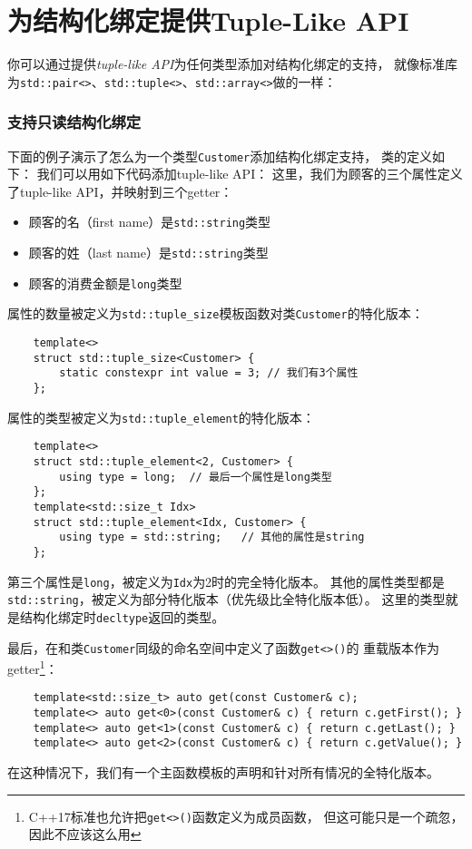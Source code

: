 \section{为结构化绑定提供Tuple-Like API}
你可以通过提供\emph{tuple-like API}为任何类型添加对结构化绑定的支持，
就像标准库为\texttt{std::pair<>}、\texttt{std::tuple<>}、\texttt{std::array<>}做的一样：

\subsubsection{支持只读结构化绑定}
下面的例子演示了怎么为一个类型\texttt{Customer}添加结构化绑定支持，
类的定义如下：
我们可以用如下代码添加tuple-like API：
这里，我们为顾客的三个属性定义了tuple-like API，并映射到三个getter：
\begin{itemize}
    \item 顾客的名（first name）是\texttt{std::string}类型
    \item 顾客的姓（last name）是\texttt{std::string}类型
    \item 顾客的消费金额是\texttt{long}类型
\end{itemize}
属性的数量被定义为\texttt{std::tuple\_size}模板函数对类\texttt{Customer}的特化版本：
\begin{lstlisting}
    template<>
    struct std::tuple_size<Customer> {
        static constexpr int value = 3; // 我们有3个属性
    };
\end{lstlisting}
属性的类型被定义为\texttt{std::tuple\_element}的特化版本：
\begin{lstlisting}
    template<>
    struct std::tuple_element<2, Customer> {
        using type = long;  // 最后一个属性是long类型
    };
    template<std::size_t Idx>
    struct std::tuple_element<Idx, Customer> {
        using type = std::string;   // 其他的属性是string
    };
\end{lstlisting}
第三个属性是\texttt{long}，被定义为\texttt{Idx}为2时的完全特化版本。
其他的属性类型都是\texttt{std::string}，被定义为部分特化版本（优先级比全特化版本低）。
这里的类型就是结构化绑定时\texttt{decltype}返回的类型。

最后，在和类\texttt{Customer}同级的命名空间中定义了函数\texttt{get<>()}的
重载版本作为getter\footnote{C++17标准也允许把\texttt{get<>()}函数定义为成员函数，
但这可能只是一个疏忽，因此不应该这么用}：
\begin{lstlisting}
    template<std::size_t> auto get(const Customer& c);
    template<> auto get<0>(const Customer& c) { return c.getFirst(); }
    template<> auto get<1>(const Customer& c) { return c.getLast(); }
    template<> auto get<2>(const Customer& c) { return c.getValue(); }
\end{lstlisting}
在这种情况下，我们有一个主函数模板的声明和针对所有情况的全特化版本。

